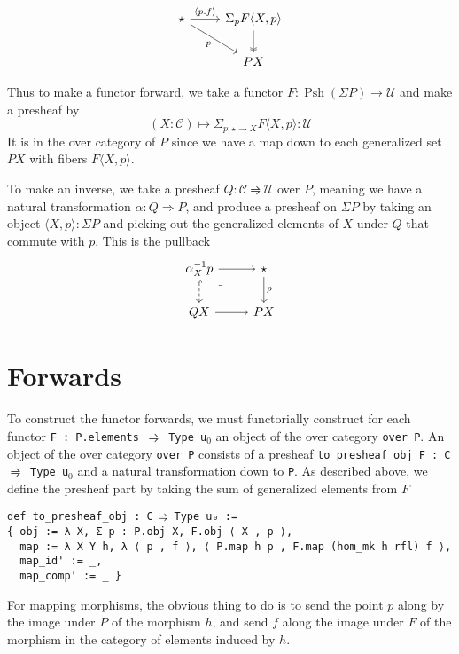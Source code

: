 \documentclass{article}
\DeclareMathOperator{\PSh}{Psh}
\newcommand{\functor}{\rightrightharpoons}
\renewcommand{\implies}{\Rightarrow}
\newcommand{\al}{\alpha}
\newcommand{\CC}{\mathcal{C}}
\newcommand{\UU}{\mathcal{U}}
\newcommand{\<}{\langle}
\renewcommand{\>}{\rangle}
\theoremstyle{definitionstyle}
\theoremstyle{exercisestyle}
\theoremstyle{remarkstyle}
\begin{document}
\[\begin{tikzcd}
	\star & \Sigma_{p} F\<X,p\> \\
        & P X
	\arrow["\<p . f\>", from=1-1, to=1-2]
	\arrow["p"', from=1-1, to=2-2]
	\arrow[two heads, from=1-2, to=2-2]
\end{tikzcd}\]

Thus to make a functor forward, we take a functor $F : \PSh(\Sigma P) \to \UU$
and make a presheaf by
\[ (X : \CC) \mapsto \Sigma_{p : \star \to X} F \< X , p \> : \UU \]
It is in the over category of $P$ since we have a map down to each generalized set $P X$
with fibers $F \< X , p \>$.

To make an inverse, we take a presheaf $Q : \CC \functor \UU$ over $P$,
meaning we have a natural transformation $\al : Q \implies P$,
and produce a presheaf on $\Sigma P$ by taking an object $\< X,p \> : \Sigma P$
and picking out the generalized elements of $X$ under $Q$
that commute with $p$.
This is the pullback
\[\begin{tikzcd}
	{\alpha_X^{-1}p} & \star \\
	{Q X} & {P X}
	\arrow["p", from=1-2, to=2-2]
	\arrow[from=2-1, to=2-2]
	\arrow[from=1-1, to=1-2]
	\arrow[dashed, hook, from=1-1, to=2-1]
	\arrow["\lrcorner"{anchor=center, pos=0.125}, draw=none, from=1-1, to=2-2]
\end{tikzcd}\]

\section{Forwards}

To construct the functor forwards, we must functorially construct for each
functor \texttt{F : P.elements $\functor$ Type u}$_{0}$ an object of the
over category \texttt{over P}.
An object of the over category \texttt{over P} consists of a presheaf
\texttt{to\_presheaf\_obj F : C $\functor$ Type u}$_{0}$
and a natural transformation down to \texttt{P}.
As described above, we define the presheaf part by taking the sum
of generalized elements from $F$

\begin{lstlisting}
def to_presheaf_obj : C ⥤ Type u₀ :=
{ obj := λ X, Σ p : P.obj X, F.obj ⟨ X , p ⟩,
  map := λ X Y h, λ ⟨ p , f ⟩, ⟨ P.map h p , F.map (hom_mk h rfl) f ⟩,
  map_id' := _,
  map_comp' := _ } \end{lstlisting}

For mapping morphisms, the obvious thing to do is to send the point $p$
along by the image under $P$ of the morphism $h$,
and send $f$ along the image under $F$ of the morphism
in the category of elements induced by $h$.
\end{document}
